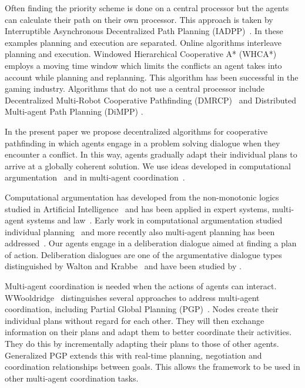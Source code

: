 Often finding the priority scheme is done on a central 
processor but the agents can calculate their path on their own processor. This 
approach is taken by Interruptible Asynchronous Decentralized Path Planning 
(IADPP)~\cite{cap2012}.
In these examples planning and execution are separated. Online algorithms 
interleave planning and execution. Windowed Hierarchical Cooperative A* 
(WHCA*)~\cite{silver2005} employs a moving time window which limits the 
conflicts an agent takes into account while planning and replanning. This 
algorithm has been successful in the gaming industry.
Algorithms that do not use a central processor include Decentralized 
Multi-Robot Cooperative Pathfinding (DMRCP)~\cite{wei2016} and Distributed 
Multi-agent Path Planning (DiMPP) \cite{chouhan2017}.

In the present paper we propose decentralized algorithms for cooperative 
pathfinding in which agents engage in a problem solving dialogue when they 
encounter a conflict. In this way, agents gradually adapt their individual 
plans to arrive at a globally coherent solution. We use ideas developed in 
computational argumentation~\cite{modgil2013} and in multi-agent 
coordination~\cite[pp.~202--204]{woodridge2009}.

Computational argumentation has developed from the non-monotonic logics studied 
in Artificial Intelligence~\cite{dung1995} and has been applied in expert 
systems, multi-agent systems and law~\cite{vaneemeren2014}. Early work in 
computational argumentation studied individual planning~\cite{pollock1995} and 
more recently also multi-agent planning has been 
addressed~\cite{ferrando2012,pardo2011}. Our agents engage in a deliberation 
dialogue aimed at finding a plan of action. Deliberation dialogues are one of 
the argumentative dialogue types distinguished by Walton and 
Krabbe~ and have been studied by 
\cite{mcburney2007,walton2014,dunin-keplicz2011}.

Multi-agent coordination is needed when the actions of agents can interact. 
WWooldridge~ distinguishes several 
approaches to address multi-agent coordination, including Partial Global 
Planning (PGP)~\cite{durfee1991}. Nodes create their individual plans without 
regard for each other. They will then exchange information on their plans and
adapt them to better coordinate their activities. They do this by incrementally 
adapting their plans to those of other agents.
Generalized PGP \cite{decker1992} extends this with real-time planning, 
negotiation and coordination relationships between goals. This allows the 
framework to be used in other multi-agent coordination tasks.

